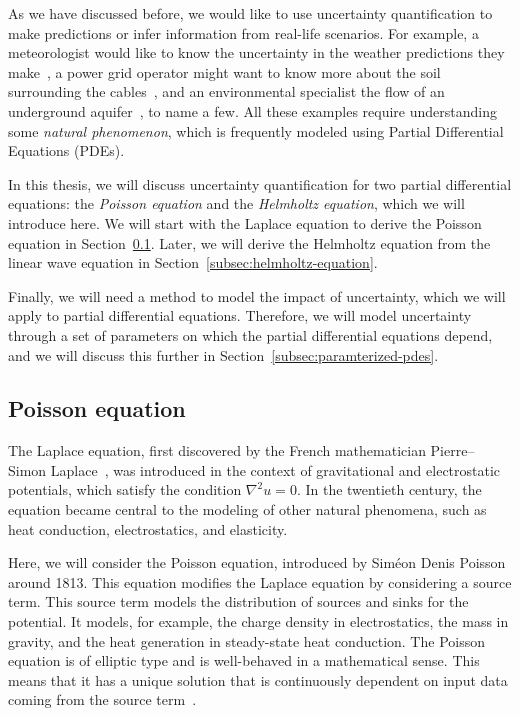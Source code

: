 As we have discussed before, we would like to use uncertainty quantification to make predictions or infer information from real-life scenarios.
For example, a meteorologist would like to know the uncertainty in the weather predictions they make~\cite{kirkup2006}, a power grid operator might want to know more about the soil surrounding the cables~\cite{vanharten2025}, and an environmental specialist the flow of an underground aquifer~\cite{ballio2004}, to name a few.
All these examples require understanding some \emph{natural phenomenon}, which is frequently modeled using Partial Differential Equations (PDEs).

In this thesis, we will discuss uncertainty quantification for two partial differential equations: the \emph{Poisson equation} and the \emph{Helmholtz equation}, which we will introduce here.
We will start with the Laplace equation to derive the Poisson equation in Section~\ref{subsec:poisson-equation}.
Later, we will derive the Helmholtz equation from the linear wave equation in Section~\ref{subsec:helmholtz-equation}.

Finally, we will need a method to model the impact of uncertainty, which we will apply to partial differential equations.
Therefore, we will model uncertainty through a set of parameters on which the partial differential equations depend, and we will discuss this further in Section~\ref{subsec:paramterized-pdes}.

\subsection{Poisson equation}\label{subsec:poisson-equation}
The Laplace equation, first discovered by the French mathematician Pierre--Simon Laplace~\cite{laplace1798}, was introduced in the context of gravitational and electrostatic potentials, which satisfy the condition $\nabla^{2}u=0$.
In the twentieth century, the equation became central to the modeling of other natural phenomena, such as heat conduction, electrostatics, and elasticity.

Here, we will consider the Poisson equation, introduced by Siméon Denis Poisson around 1813.
This equation modifies the Laplace equation by considering a source term.
This source term models the distribution of sources and sinks for the potential.
It models, for example, the charge density in electrostatics, the mass in gravity, and the heat generation in steady-state heat conduction.
The Poisson equation is of elliptic type and is well-behaved in a mathematical sense.
This means that it has a unique solution that is continuously dependent on input data coming from the source term~\cite{evans2010}.

